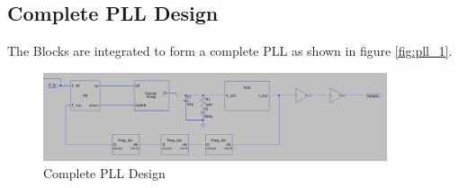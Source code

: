 \subsection{Complete PLL Design}
\label{sec:complete_pll}
The Blocks are integrated to form a complete PLL as shown in figure \ref{fig:pll_1}.
\begin{figure}[H]
	\centering
	\includegraphics[width=0.9\textwidth]{figs/pll_circuit.png}
	\caption{Complete PLL Design}
	\label{fig:PLL Design}
	\vspace{0.5cm}
\end{figure}

